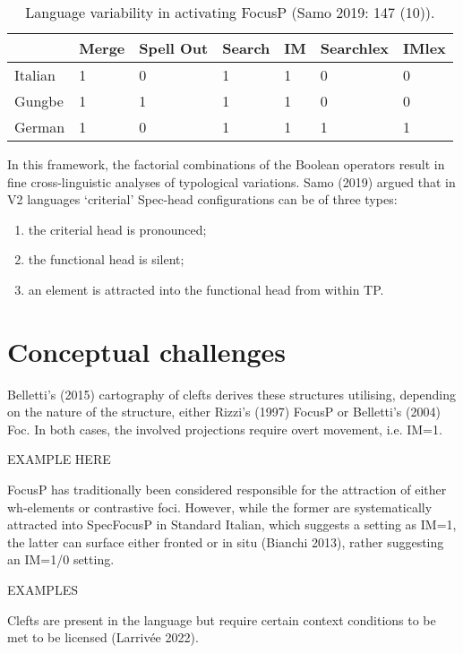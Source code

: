\documentclass[fleqn,10pt]{wlscirep}
\begin{document}
\begin{table}[ht]
    \centering
    \begin{tabular}{|l|l|l|l|l|l|l|}
    \hline
     & Merge & Spell Out & Search & IM & Searchlex & IMlex \\
    \hline
    Italian & 1 & 0 & 1 & 1 & 0 & 0 \\
    \hline
    Gungbe & 1 & 1 & 1 & 1 & 0 & 0 \\
    \hline
    German & 1 & 0 & 1 & 1 & 1 & 1 \\
    \hline
    \end{tabular}
    \caption{\label{tab:samp}Language variability in activating FocusP (Samo 2019: 147 (10)).}
    \end{table}

In this framework, the factorial combinations of the Boolean operators result in fine cross-linguistic analyses of typological variations. Samo (2019) argued that in V2 languages ‘criterial’ Spec-head configurations can be of three types: 

\begin{enumerate}[i]
    \item the criterial head is pronounced; 
    \item the functional head is silent; 
    \item an element is attracted into the functional head from within TP. 
\end{enumerate}


\section*{Conceptual challenges}

Belletti’s (2015) cartography of clefts derives these structures utilising, depending on the nature of the structure, either Rizzi’s (1997) FocusP or Belletti’s (2004) Foc. 
In both cases, the involved projections require overt movement, i.e. IM=1.

EXAMPLE HERE

FocusP has traditionally been considered responsible for the attraction of either wh-elements or contrastive foci. 
However, while the former are systematically attracted into SpecFocusP in Standard Italian, which suggests a setting as IM=1, the latter can surface either fronted or in situ (Bianchi 2013), rather suggesting an IM=1/0 setting. 

EXAMPLES

Clefts are present in the language but require certain context conditions to be met to be licensed (Larrivée 2022). 
\end{document}
